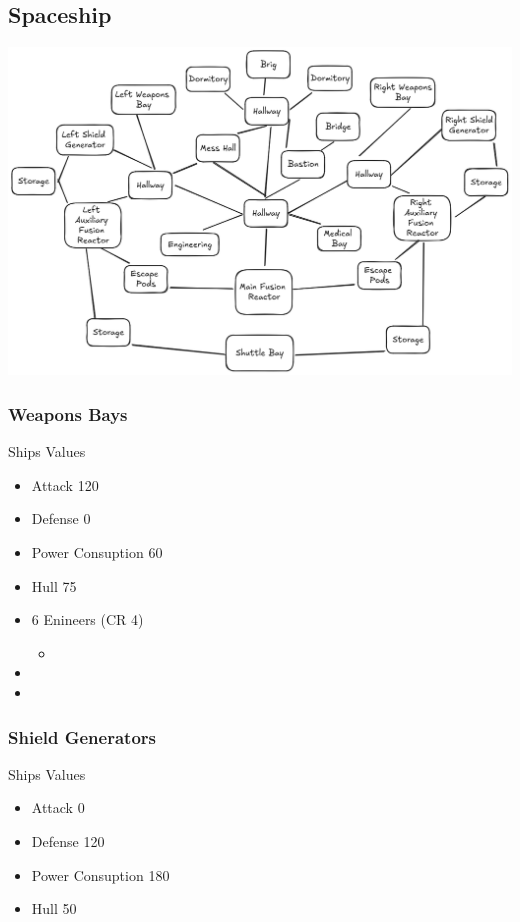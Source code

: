 \documentclass[11pt]{article}
\begin{document}
{\subsection{Spaceship}
\label{sec:org1412e73}


\begin{center}
\includegraphics[width=.9\linewidth]{images/Space Ship.png}
\end{center}
\subsubsection{Weapons Bays}
\label{sec:org657558b}
Ships Values
\begin{itemize}
\item Attack 120
\item Defense 0
\item Power Consuption 60
\item Hull 75

\item 6 Enineers (CR 4)
\begin{itemize}
\item {}
\end{itemize}
\item {}
\item {}
\end{itemize}
\subsubsection{Shield  Generators}
\label{sec:org68dc602}
Ships Values
\begin{itemize}
\item Attack 0
\item Defense 120
\item Power Consuption 180
\item Hull 50


\end{itemize}}
\end{document}

